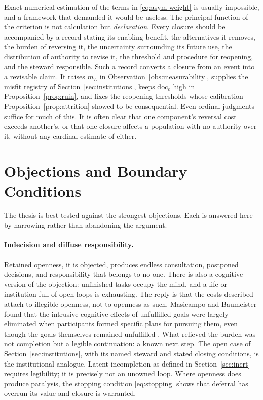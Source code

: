 Exact numerical estimation of the terms in \eqref{eq:asym-weight} is usually impossible, and a framework that demanded it would be useless. The principal function of the criterion is not calculation but \emph{declaration}. Every closure should be accompanied by a record stating its enabling benefit, the alternatives it removes, the burden of reversing it, the uncertainty surrounding its future use, the distribution of authority to revise it, the threshold and procedure for reopening, and the steward responsible. Such a record converts a closure from an event into a revisable claim. It raises $m_L$ in Observation~\ref{obs:measurability}, supplies the misfit registry of Section~\ref{sec:institutions}, keeps $\mathrm{doc}_e$ high in Proposition~\ref{prop:ruin}, and fixes the reopening thresholds whose calibration Proposition~\ref{prop:attrition} showed to be consequential. Even ordinal judgments suffice for much of this. It is often clear that one component's reversal cost exceeds another's, or that one closure affects a population with no authority over it, without any cardinal estimate of either.

\section{Objections and Boundary Conditions}\label{sec:objections}

The thesis is best tested against the strongest objections. Each is answered here by narrowing rather than abandoning the argument.

\paragraph{Indecision and diffuse responsibility.} Retained openness, it is objected, produces endless consultation, postponed decisions, and responsibility that belongs to no one. There is also a cognitive version of the objection: unfinished tasks occupy the mind, and a life or institution full of open loops is exhausting. The reply is that the costs described attach to illegible openness, not to openness as such. Masicampo and Baumeister found that the intrusive cognitive effects of unfulfilled goals were largely eliminated when participants formed specific plans for pursuing them, even though the goals themselves remained unfulfilled \cite{masicampo2011}. What relieved the burden was not completion but a legible continuation: a known next step. The open case of Section~\ref{sec:institutions}, with its named steward and stated closing conditions, is the institutional analogue. Latent incompletion as defined in Section~\ref{sec:inert} requires legibility; it is precisely not an unowned loop. Where openness does produce paralysis, the stopping condition \eqref{eq:stopping} shows that deferral has overrun its value and closure is warranted.

